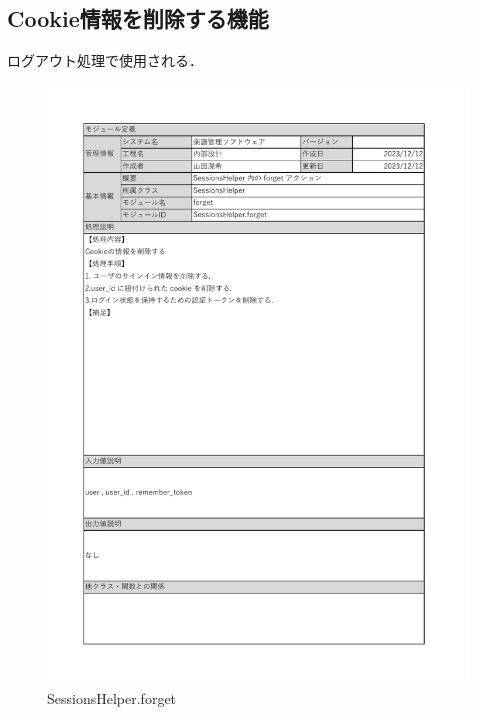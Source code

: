 \subsection*{Cookie情報を削除する機能}
ログアウト処理で使用される．
\begin{figure}[H]
    \centering
    \includegraphics[scale=0.5]{img/Helper/SessionsHelper_forget.pdf}
    \caption{SessionsHelper.forget}
\end{figure}
\clearpage

